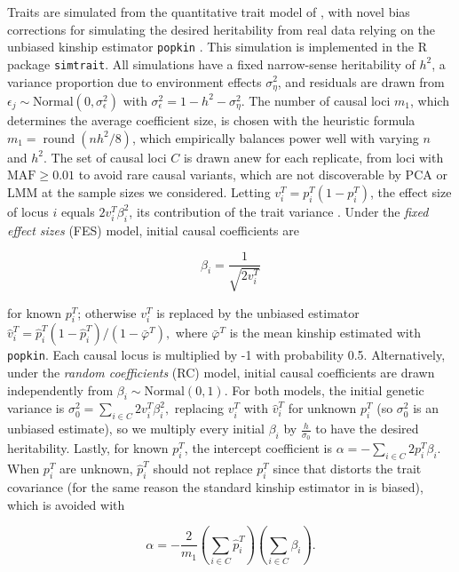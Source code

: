 \documentclass[9pt,lineno]{elife}
\DeclareMathOperator{\round}{round}
\newcommand{\pit}{p_i^T}
\newcommand{\pith}{\hat{p}_i^T}
\begin{document}
Traits are simulated from the quantitative trait model of , with novel bias corrections for simulating the desired heritability from real data relying on the unbiased kinship estimator \texttt{popkin} \citep{ochoa_estimating_2021}.
This simulation is implemented in the R package \texttt{simtrait}.
All simulations have a fixed narrow-sense heritability of $h^2$, a variance proportion due to environment effects $\sigma^2_\eta$, and residuals are drawn from $\epsilon_j \sim \text{Normal}(0, \sigma^2_\epsilon )$ with $\sigma^2_\epsilon = 1 - h^2 - \sigma^2_\eta$.
The number of causal loci $m_1$, which determines the average coefficient size, is chosen with the heuristic formula $m_1 = \round( n h^2 / 8 )$, which empirically balances power well with varying $n$ and $h^2$.
The set of causal loci $C$ is drawn anew for each replicate, from loci with $\text{MAF} \ge 0.01$ to avoid rare causal variants, which are not discoverable by PCA or LMM at the sample sizes we considered.
Letting $v_i^T = \pit \left( 1 - \pit \right)$, the effect size of locus $i$ equals $2 v_i^T \beta_i^2$, its contribution of the trait variance \citep{park_estimation_2010}.
Under the \textit{fixed effect sizes} (FES) model, initial causal coefficients are
\begin{linenomath*}
  $$
  \beta_i = \frac{1}{ \sqrt{ 2 v_i^T } }
  $$
\end{linenomath*}
for known $\pit$; otherwise $v_i^T$ is replaced by the unbiased estimator \citep{ochoa_estimating_2021}
$
\hat{v}_i^T
=
\pith \left( 1 - \pith \right) / ( 1 - \bar{\varphi}^T )
,
$
where $\bar{\varphi}^T$ is the mean kinship estimated with \texttt{popkin}.
Each causal locus is multiplied by -1 with probability 0.5.
Alternatively, under the \textit{random coefficients} (RC) model, initial causal coefficients are drawn independently from $\beta_i \sim \text{Normal}( 0, 1 )$.
For both models, the initial genetic variance is
$
\sigma^2_0
=
\sum_{i \in C} 2 v_i^T \beta_i^2 ,
$
replacing $v_i^T$ with $\hat{v}_i^T$ for unknown $\pit$ (so $\sigma^2_0$ is an unbiased estimate), so we multiply every initial $\beta_i$ by $\frac{h}{ \sigma_0 }$ to have the desired heritability.
Lastly, for known $\pit$, the intercept coefficient is
$
\alpha = - \sum_{i \in C} 2 \pit \beta_i.
$
When $\pit$ are unknown, $\pith$ should not replace $\pit$ since that distorts the trait covariance (for the same reason the standard kinship estimator in  is biased), which is avoided with
\begin{linenomath*}
  $$
  \alpha = - \frac{2}{m_1} \left( \sum_{i \in C} \pith \right) \left(\sum_{i \in C} \beta_i \right).
  $$
\end{linenomath*}
\end{document}
